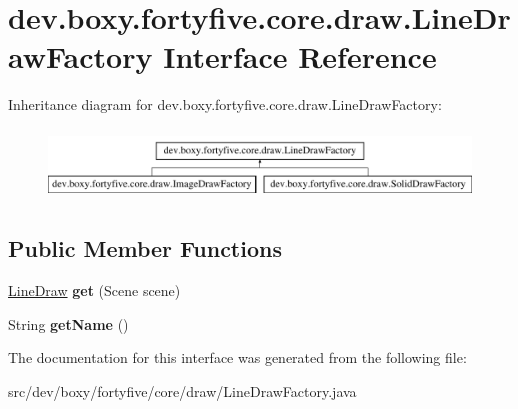\hypertarget{interfacedev_1_1boxy_1_1fortyfive_1_1core_1_1draw_1_1_line_draw_factory}{
\section{dev.boxy.fortyfive.core.draw.LineDrawFactory Interface Reference}
\label{d9/dc3/interfacedev_1_1boxy_1_1fortyfive_1_1core_1_1draw_1_1_line_draw_factory}
}
Inheritance diagram for dev.boxy.fortyfive.core.draw.LineDrawFactory:\begin{figure}[H]
\begin{center}
\leavevmode
\includegraphics[height=1.891892cm]{d9/dc3/interfacedev_1_1boxy_1_1fortyfive_1_1core_1_1draw_1_1_line_draw_factory}
\end{center}
\end{figure}
\subsection*{Public Member Functions}
\begin{DoxyCompactItemize}
\item 
\hypertarget{interfacedev_1_1boxy_1_1fortyfive_1_1core_1_1draw_1_1_line_draw_factory_aec48ac4696c932939caaa2ca15f4ac4a}{
\hyperlink{interfacedev_1_1boxy_1_1fortyfive_1_1core_1_1draw_1_1_line_draw}{LineDraw} {\bfseries get} (Scene scene)}
\label{d9/dc3/interfacedev_1_1boxy_1_1fortyfive_1_1core_1_1draw_1_1_line_draw_factory_aec48ac4696c932939caaa2ca15f4ac4a}

\item 
\hypertarget{interfacedev_1_1boxy_1_1fortyfive_1_1core_1_1draw_1_1_line_draw_factory_a1c4c85787426928e735a52773976fa48}{
String {\bfseries getName} ()}
\label{d9/dc3/interfacedev_1_1boxy_1_1fortyfive_1_1core_1_1draw_1_1_line_draw_factory_a1c4c85787426928e735a52773976fa48}

\end{DoxyCompactItemize}


The documentation for this interface was generated from the following file:\begin{DoxyCompactItemize}
\item 
src/dev/boxy/fortyfive/core/draw/LineDrawFactory.java\end{DoxyCompactItemize}

